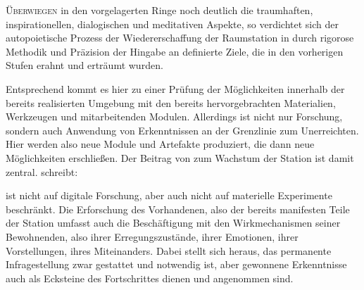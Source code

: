 \begin{newstuff}
    \lettrine{Ü}{berwiegen} in den vorgelagerten Ringe noch deutlich die traumhaften, inspirationellen, dialogischen und meditativen Aspekte, so verdichtet sich der autopoietische Prozess der Wiedererschaffung der Raumstation in  durch rigorose Methodik und Präzision der Hingabe an definierte Ziele, die in den vorherigen Stufen erahnt und erträumt wurden.

    Entsprechend kommt es hier zu einer Prüfung der Möglichkeiten innerhalb der bereits realisierten Umgebung mit den bereits hervorgebrachten Materialien, Werkzeugen und mitarbeitenden Modulen. Allerdings ist  nicht nur Forschung, sondern auch Anwendung von Erkenntnissen an der Grenzlinie zum Unerreichten. Hier werden also neue Module und Artefakte produziert, die dann neue Möglichkeiten erschließen. Der Beitrag von  zum Wachstum der Station ist damit zentral. \cite[S. 135]{cbasebook} schreibt:


     ist nicht auf digitale Forschung, aber auch nicht auf materielle Experimente beschränkt. Die Erforschung des Vorhandenen, also der bereits manifesten Teile der Station umfasst auch die Beschäftigung mit den Wirkmechanismen seiner Bewohnenden, also ihrer Erregungszustände, ihrer Emotionen, ihrer Vorstellungen, ihres Miteinanders. Dabei stellt sich heraus, das permanente Infragestellung zwar gestattet und notwendig ist, aber gewonnene Erkenntnisse auch als Ecksteine des Fortschrittes dienen und angenommen sind.


\end{newstuff}
